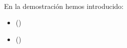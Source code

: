 \begin{isabellebody}
\ \ \ \ \ \ \ \ \isamarkupfalse%
%
\endisatagproof
{\isafoldproof}%
%
\isadelimproof
%
\endisadelimproof
%
\begin{isamarkuptext}%
En la demostración hemos introducido: 
 \begin{itemize}
    \item[]  
      \hfill () 
  \end{itemize} 
 \begin{itemize}
    \item[]  
      \hfill ()
  \end{itemize} 


\end{isamarkuptext}
\end{isabellebody}
